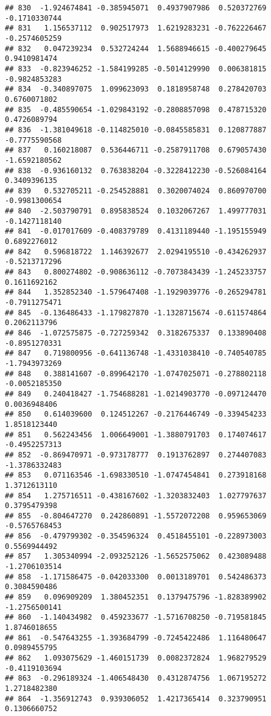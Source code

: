 \documentclass[
]{article}
\begin{document}
\begin{verbatim}
## 830  -1.924674841 -0.385945071  0.4937907986  0.520372769 -0.1710330744
## 831   1.156537112  0.902517973  1.6219283231 -0.762226467 -0.2574605259
## 832   0.047239234  0.532724244  1.5688946615 -0.400279645  0.9410981474
## 833  -0.823946252 -1.584199285 -0.5014129990  0.006381815 -0.9824853283
## 834  -0.340897075  1.099623093  0.1818958748  0.278420703  0.6760071802
## 835  -0.485590654 -1.029843192 -0.2808857098  0.478715320  0.4726089794
## 836  -1.381049618 -0.114825010 -0.0845585831  0.120877887 -0.7775590568
## 837   0.160218087  0.536446711 -0.2587911708  0.679057430 -1.6592180562
## 838  -0.936160132  0.763838204 -0.3228412230 -0.526084164  0.3409396135
## 839   0.532705211 -0.254528881  0.3020074024  0.860970700 -0.9981300654
## 840  -2.503790791  0.895838524  0.1032067267  1.499777031 -0.1427118140
## 841  -0.017017609 -0.408379789  0.4131189440 -1.195155949  0.6892276012
## 842   0.596818722  1.146392677  2.0294195510 -0.434262937 -0.5213717296
## 843   0.800274802 -0.908636112 -0.7073843439 -1.245233757  0.1611692162
## 844   1.352852340 -1.579647408 -1.1929039776 -0.265294781 -0.7911275471
## 845  -0.136486433 -1.179827870 -1.1328715674 -0.611574864  0.2062113796
## 846  -1.072575875 -0.727259342  0.3182675337  0.133890408 -0.8951270331
## 847   0.719800956 -0.641136748 -1.4331038410 -0.740540785 -1.7943973269
## 848   0.388141607 -0.899642170 -1.0747025071 -0.278802118 -0.0052185350
## 849   0.240418427 -1.754688281 -1.0214903770 -0.097124470  0.0036948406
## 850   0.614039600  0.124512267 -0.2176446749 -0.339454233  1.8518123440
## 851   0.562243456  1.006649001 -1.3880791703  0.174074617 -0.4952257313
## 852  -0.869470971 -0.973178777  0.1913762897  0.274407083 -1.3786332483
## 853   0.071163546 -1.698330510 -1.0747454841  0.273918168  1.3712613110
## 854   1.275716511 -0.438167602 -1.3203832403  1.027797637  0.3795479398
## 855  -0.804647270  0.242860891 -1.5572072208  0.959653069 -0.5765768453
## 856  -0.479799302 -0.354596324  0.4518455101 -0.228973003  0.5569944492
## 857   1.305340994 -2.093252126 -1.5652575062  0.423089488 -1.2706103514
## 858  -1.171586475 -0.042033300  0.0013189701  0.542486373  0.3084590486
## 859   0.096909209  1.380452351  0.1379475796 -1.828389902 -1.2756500141
## 860  -1.140434982  0.459233677 -1.5716708250 -0.719581845  1.8746018655
## 861  -0.547643255 -1.393684799 -0.7245422486  1.116480647  0.0989455795
## 862   1.093075629 -1.460151739  0.0082372824  1.968279529 -0.4119103694
## 863  -0.296189324 -1.406548430  0.4312874756  1.067195272  1.2718482380
## 864  -1.356912743  0.939306052  1.4217365414  0.323790951  0.1306660752

\end{verbatim}
\end{document}
